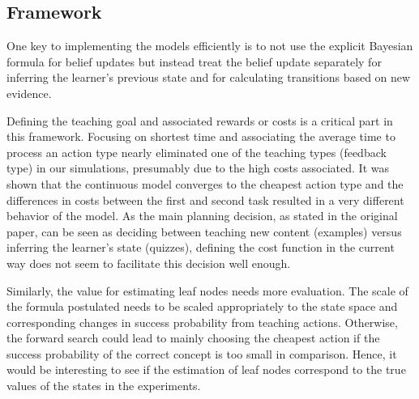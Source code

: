 

\subsection{Framework}
One key to implementing the models efficiently is to not use the explicit Bayesian formula for belief updates but instead treat the belief update separately for inferring the learner's previous state and for calculating transitions based on new evidence.



Defining the teaching goal and associated rewards or costs is a critical part in this framework.
Focusing on shortest time and associating the average time to process an action type nearly eliminated one of the teaching types (feedback type) in our simulations, presumably due to the high costs associated. 
It was shown that the continuous model converges to the cheapest action type and the differences in costs between the first and second task resulted in a very different behavior of the model.
As the main planning decision, as stated in the original paper, can be seen as deciding between teaching new content (examples) versus inferring the learner's state (quizzes), defining the cost function in the current way does not seem to facilitate this decision well enough. 


Similarly, the value for estimating leaf nodes needs more evaluation. 
The scale of the formula postulated needs to be scaled appropriately to the state space and corresponding changes in success probability from teaching actions. 
Otherwise, the forward search could lead to mainly choosing the cheapest action if the success probability of the correct concept is too small in comparison.
Hence, it would be interesting to see if the estimation of leaf nodes correspond to the true values of the states in the experiments.

